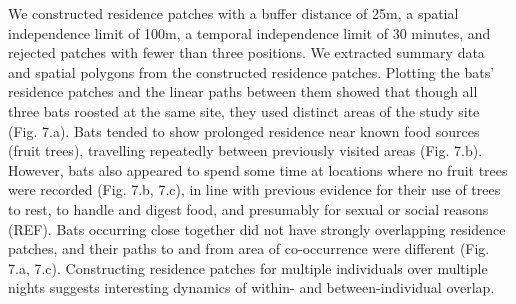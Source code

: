 \documentclass[10pt,paper=a4,headings=standardclasses
]{scrartcl}
\begin{document}
We constructed residence patches with a buffer distance of 25m, a spatial independence limit of 100m, a temporal independence limit of 30 minutes, and rejected patches with fewer than three positions.
We extracted summary data and spatial polygons from the constructed residence patches.
Plotting the bats' residence patches and the linear paths between them showed that though all three bats roosted at the same site, they used distinct areas of the study site (Fig. 7.a).
Bats tended to show prolonged residence near known food sources (fruit trees), travelling repeatedly between previously visited areas (Fig. 7.b).
However, bats also appeared to spend some time at locations where no fruit trees were recorded (Fig. 7.b, 7.c), in line with previous evidence for their use of trees to rest, to handle and digest food, and presumably for sexual or social reasons (REF).
Bats occurring close together did not have strongly overlapping residence patches, and their paths to and from area of co-occurrence were different (Fig. 7.a, 7.c).
Constructing residence patches for multiple individuals over multiple nights suggests interesting dynamics of within- and between-individual overlap.
\end{document}
